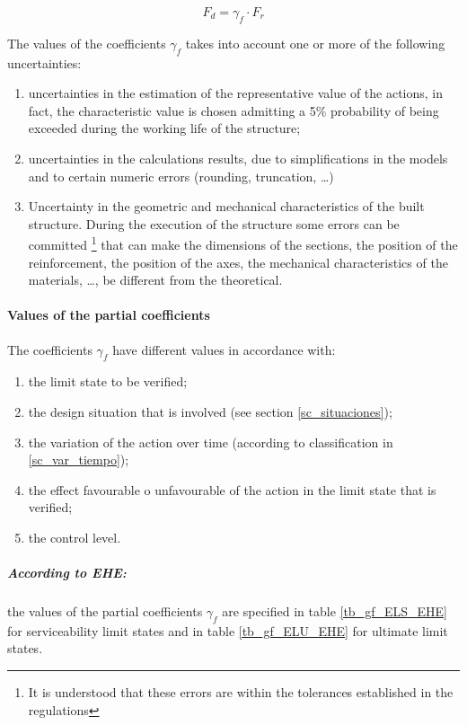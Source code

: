 \begin{equation}
F_d= \gamma_f \cdot F_r
\end{equation}

The values of the coefficients $\gamma_f$ takes into account one or more of the following uncertainties:

\begin{enumerate}
\item uncertainties in the estimation of the representative value of the actions, in fact, the characteristic value is chosen admitting a 5\% probability of being exceeded during the working life of the structure;
\item uncertainties in the calculations results, due to simplifications in the models and to certain numeric errors (rounding, truncation, \ldots)
\item Uncertainty in the geometric and mechanical characteristics of the built structure. During the execution of the structure some errors can be committed \footnote{It is understood that these errors are within the tolerances established in the regulations} that can make the dimensions of the sections, the position of the reinforcement, the position of the axes, the mechanical characteristics of the materials, \ldots, be different from the theoretical.
\end{enumerate}

\paragraph{Values of the partial coefficients}
The coefficients $\gamma_f$ have different values in accordance with:
\begin{enumerate}
\item the limit state to be verified;
\item the design situation that is involved (see section \ref{sc_situaciones});
\item the variation of the action over time (according to classification in \ref{sc_var_tiempo});
\item the effect favourable o unfavourable of the action in the limit state that is verified;
\item the control level.
\end{enumerate}

\subparagraph{According to EHE:} the values of the partial coefficients $\gamma_f$ are specified in table \ref{tb_gf_ELS_EHE} for serviceability limit states and in table \ref{tb_gf_ELU_EHE} for ultimate limit states.

